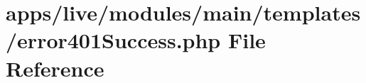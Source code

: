 \hypertarget{live_2modules_2main_2templates_2error401_success_8php}{\section{apps/live/modules/main/templates/error401\-Success.php File Reference}
\label{live_2modules_2main_2templates_2error401_success_8php}
}
